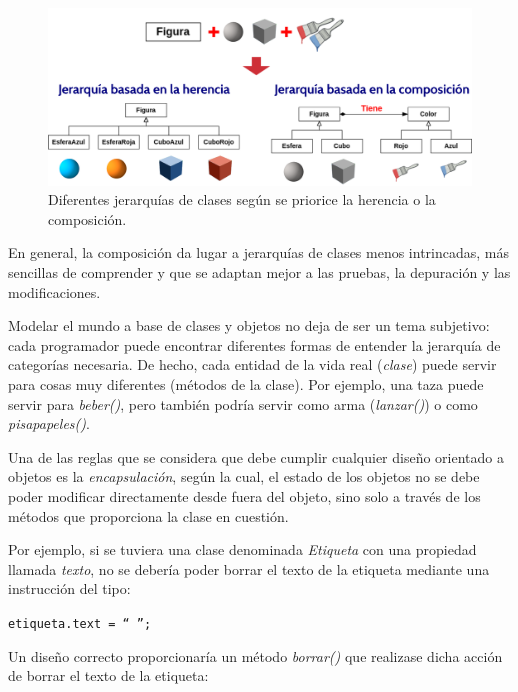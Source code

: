 \begin{figure}[htb]
   \begin{center}
      \includegraphics[width=\textwidth]{img/herencia_composicion.png}
      \caption{Diferentes jerarquías de clases según se priorice la herencia o la composición.}
      \label{fig_herencia_composicion}
   \end{center}
\end{figure}

En general, la composición da lugar a jerarquías de clases menos intrincadas, más sencillas de comprender y que se adaptan mejor a las pruebas, la depuración y las modificaciones.

Modelar el mundo a base de clases y objetos no deja de ser un tema subjetivo: cada programador puede encontrar diferentes formas de entender la jerarquía de categorías necesaria. De hecho, cada entidad de la vida real (\textit{clase}) puede servir para cosas muy diferentes (métodos de la clase). Por ejemplo, una taza puede servir para \textit{beber()}, pero también podría servir como arma (\textit{lanzar()}) o como \textit{pisapapeles()}.

Una de las reglas que se considera que debe cumplir cualquier diseño orientado a objetos es la \textit{encapsulación}, según la cual, el estado de los objetos no se debe poder modificar directamente desde fuera del objeto, sino solo a través de los métodos que proporciona la clase en cuestión. 

Por ejemplo, si se tuviera una clase denominada \textit{Etiqueta} con una propiedad llamada \textit{texto}, no se debería poder borrar el texto de la etiqueta mediante una instrucción del tipo:

{\centering \texttt{etiqueta.text = `` '';} \par}

Un diseño correcto proporcionaría un método \textit{borrar()} que realizase dicha acción de borrar el texto de la etiqueta:

